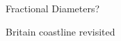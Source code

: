 \documentclass[10pt]{beamer}
\begin{document}
\begin{frame}{Fractional Diameters?}
\end{frame}

\begin{frame}{Britain coastline revisited}
\end{frame}
\end{document}
